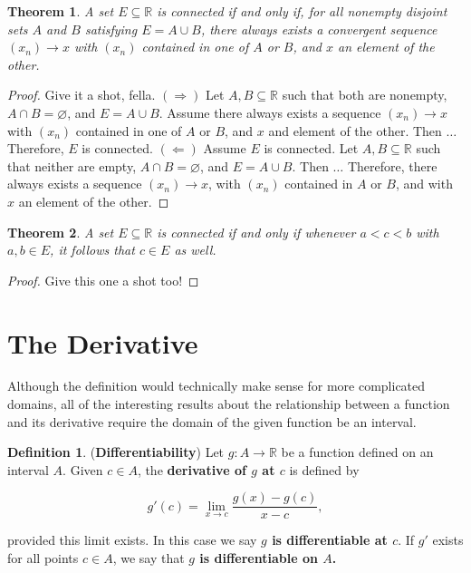 \documentclass{article}
\newtheorem{theorem}{Theorem}[section]
\theoremstyle{definition}
\newtheorem{definition}{Definition}[section]
\theoremstyle{remark}
\theoremstyle{definition}
\begin{document}
\begin{theorem}
    A set $E\subseteq\mathbb{R}$ is connected if and only if, for all nonempty disjoint sets $A$ and $B$ satisfying $E=A\cup B$, there always exists a convergent sequence $(x_n)\rightarrow x$ with $(x_n)$ contained in one of $A$ or $B$, and $x$ an element of the other. 
\end{theorem}

\begin{proof}
    Give it a shot, fella. $(\Rightarrow)$ Let $A,B\subseteq\mathbb{R}$ such that both are nonempty, $A\cap B=\varnothing$, and $E=A\cup B$. Assume there always exists a sequence $(x_n)\rightarrow x$ with $(x_n)$ contained in one of $A$ or $B$, and $x$ and element of the other. Then $\dots$ Therefore, $E$ is connected. $(\Leftarrow)$ Assume $E$ is connected. Let $A,B\subseteq\mathbb{R}$ such that neither are empty, $A\cap B=\varnothing$, and $E=A\cup B$. Then $\dots$ Therefore, there always exists a sequence $(x_n)\rightarrow x$, with $(x_n)$ contained in $A$ or $B$, and with $x$ an element of the other.
\end{proof}

\begin{theorem}
    A set $E\subseteq\mathbb{R}$ is connected if and only if whenever $a<c<b$ with $a,b\in E$, it follows that $c\in E$ as well.
\end{theorem} 

\begin{proof}
    Give this one a shot too! 
\end{proof}

\newpage

\section{The Derivative}

Although the definition would technically make sense for more complicated domains, all of the interesting results about the relationship between a function and its derivative require the domain of the given function be an interval.

\begin{definition}
    (\textbf{Differentiability}) Let $g\colon A\rightarrow\mathbb{R}$ be a function defined on an interval $A$. Given $c\in A$, the \textbf{derivative of $g$ at $c$} is defined by
    
    \begin{equation*}
        g'(c)=\lim_{x\rightarrow c}\frac{g(x)-g(c)}{x-c},
    \end{equation*}
    
    \noindent provided this limit exists. In this case we say \textbf{$g$ is differentiable at $c$}. If $g'$ exists for all points $c\in A$, we say that \textbf{$g$ is differentiable on $A$.}
\end{definition}
\end{document}
